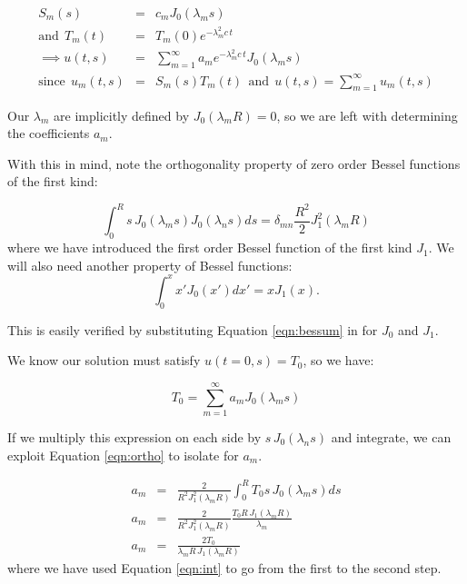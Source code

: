 \documentclass[a4paper,12pt]{article}
\begin{document}
\begin{eqnarray}
S_m(s) &=& c_m J_0(\lambda_m s)\nonumber\\
\mathrm{and}\:\: T_m(t) &=& T_m(0)e^{-\lambda_m^2 c\,t}\nonumber\\
\implies u(t,s) &=& \sum_{m=1}^{\infty}a_m e^{-\lambda_m^2 c\,t} J_0(\lambda_m s)\nonumber\\
\mathrm{since}\:\: u_m(t,s) &=& S_m(s)T_m(t)\:\:\mathrm{and}\:\: u(t,s) = \sum_{m=1}^{\infty}u_m(t,s)\nonumber 
\end{eqnarray}

Our $\lambda_m$ are implicitly defined by $J_0(\lambda_m R) = 0$, so we are left with determining the coefficients $a_m$.

With this in mind, note the orthogonality property of zero order Bessel functions of the first kind: 

\begin{equation}
\int_{0}^{R}s\,J_0(\lambda_m s)J_0(\lambda_n s)ds = \delta_{mn}\frac{R^2}{2}J_1^2(\lambda_m R)
\label{eqn:ortho}
\end{equation}
%
where we have introduced the first order Bessel function of the first kind $J_1$. We will also need another property of Bessel functions:
\begin{equation}
\int_{0}^{x} x'J_0(x')dx' = xJ_1(x).
\label{eqn:int}
\end{equation} 

This is easily verified by substituting Equation \ref{eqn:bessum} in for $J_0$ and $J_1$.

We know our solution must satisfy $u(t=0,s) = T_0$, so we have:

\begin{equation}
T_0 = \sum_{m=1}^{\infty}a_m J_0(\lambda_m s)\nonumber
\end{equation}

If we multiply this expression on each side by $s\,J_0(\lambda_n s)$ and integrate, we can exploit Equation \ref{eqn:ortho} to isolate for $a_m$.

\begin{eqnarray}
a_m &=& \frac{2}{R^2 J_1^2(\lambda_m R)}\int_{0}^{R}T_0 s\,J_0(\lambda_m s)ds\nonumber\\
a_m &=& \frac{2}{R^2 J_1^2(\lambda_m R)} \frac{T_0 R\, J_1(\lambda_m R)}{\lambda_m}\nonumber\\
a_m &=& \frac{2 T_0}{\lambda_m R\, J_1(\lambda_m R)}\nonumber
\end{eqnarray}
%
where we have used Equation \ref{eqn:int} to go from the first to the second step.
\end{document}
